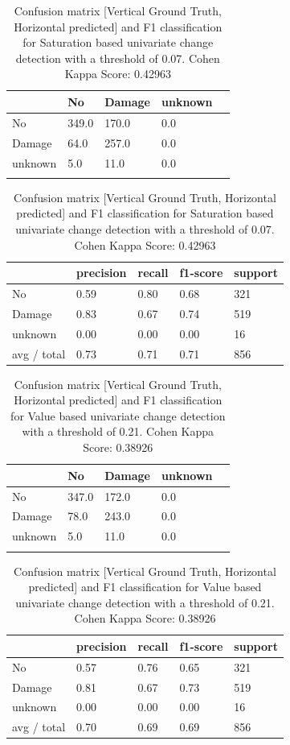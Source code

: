 \begin{table} [H]
	\footnotesize
	\captionsetup{justification=raggedright,singlelinecheck=false}
	\caption{Confusion matrix [Vertical Ground Truth, Horizontal predicted] and F1 classification for Saturation based univariate change detection with a threshold of 0.07. Cohen Kappa Score: 0.42963}
	\begin{tabular}{l|llll}
		& No    & Damage & unknown &  \\ \hline
		No      & 349.0 & 170.0  & 0.0     &  \\
		Damage  & 64.0  & 257.0  & 0.0     &  \\
		unknown & 5.0   & 11.0   & 0.0     &  \\
		&       &        &         & 
	\end{tabular}
	\begin{tabular}{l|llll}
		& precision & recall & f1-score & support \\ \hline
		No          & 0.59      & 0.80   & 0.68     & 321     \\
		Damage      & 0.83      & 0.67   & 0.74     & 519     \\
		unknown     & 0.00      & 0.00   & 0.00     & 16      \\
		avg / total & 0.73      & 0.71   & 0.71     & 856    
	\end{tabular}

	\label{tab:matS}
\end{table}
 
\begin{table} [H]
	\footnotesize
	\captionsetup{justification=raggedright,singlelinecheck=false}
	\caption{Confusion matrix [Vertical Ground Truth, Horizontal predicted] and F1 classification for Value based univariate change detection with a threshold of 0.21. Cohen Kappa Score: 0.38926 }
	\begin{tabular}{l|llll}
		& No    & Damage & unknown &  \\ \hline
		No      & 347.0 & 172.0  & 0.0     &  \\
		Damage  & 78.0  & 243.0  & 0.0     &  \\
		unknown & 5.0   & 11.0   & 0.0     &  \\
		&       &        &         & 
	\end{tabular}
	\begin{tabular}{l|llll}
		& precision & recall & f1-score & support \\ \hline
		No          & 0.57      & 0.76   & 0.65     & 321     \\
		Damage      & 0.81      & 0.67   & 0.73     & 519     \\
		unknown     & 0.00      & 0.00   & 0.00     & 16      \\
		avg / total & 0.70      & 0.69   & 0.69     & 856    
	\end{tabular}
	\label{tab:matV}
\end{table}

